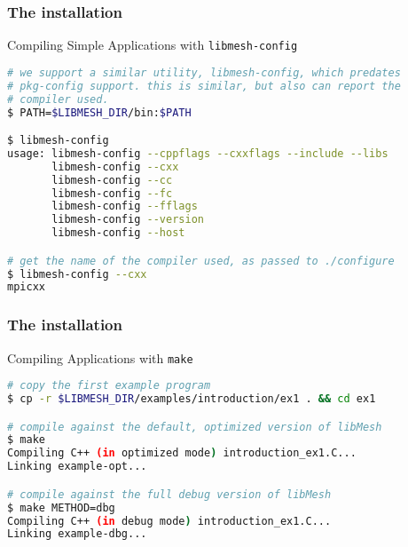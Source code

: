 \begin{frame}
  \frametitle{The \libMesh{} installation}

  \begin{block}{Compiling Simple Applications with \texttt{libmesh-config}}
    \begin{lstlisting}[language=bash]
# we support a similar utility, libmesh-config, which predates
# pkg-config support. this is similar, but also can report the
# compiler used.
$ PATH=$LIBMESH_DIR/bin:$PATH

$ libmesh-config
usage: libmesh-config --cppflags --cxxflags --include --libs
       libmesh-config --cxx
       libmesh-config --cc
       libmesh-config --fc
       libmesh-config --fflags
       libmesh-config --version
       libmesh-config --host

# get the name of the compiler used, as passed to ./configure
$ libmesh-config --cxx
mpicxx
    \end{lstlisting}
  \end{block}
\end{frame}



\begin{frame}
  \frametitle{The \libMesh{} installation}

  \begin{block}{Compiling Applications with \texttt{make}}
    \begin{lstlisting}[language=bash]
# copy the first example program
$ cp -r $LIBMESH_DIR/examples/introduction/ex1 . && cd ex1

# compile against the default, optimized version of libMesh
$ make
Compiling C++ (in optimized mode) introduction_ex1.C...
Linking example-opt...

# compile against the full debug version of libMesh
$ make METHOD=dbg
Compiling C++ (in debug mode) introduction_ex1.C...
Linking example-dbg...
    \end{lstlisting}
  \end{block}
\end{frame}



